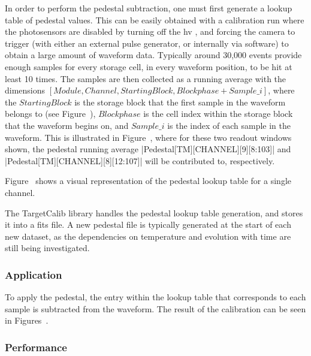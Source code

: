 In order to perform the pedestal subtraction, one must first generate a lookup table of pedestal values. This can be easily obtained with a calibration run where the photosensors are disabled by turning off the \gls{hv} , and forcing the camera to trigger (with either an external pulse generator, or internally via software) to obtain a large amount of waveform data. Typically around 30,000 events provide enough samples for every storage cell, in every waveform position, to be hit at least 10 times. The samples are then collected as a running average with the dimensions $[Module, Channel, Starting Block, Blockphase+Sample\_i]$, where the $Starting Block$ is the storage block that the first sample in the waveform belongs to (see Figure~), $Blockphase$ is the cell index within the storage block that the waveform begins on, and $Sample\_i$ is the index of each sample in the waveform. This is illustrated in Figure~, where for these two readout windows shown, the pedestal running average |Pedestal[TM][CHANNEL][9][8:103]| and |Pedestal[TM][CHANNEL][8][12:107]| will be contributed to, respectively.

Figure~ shows a visual representation of the pedestal lookup table for a single channel. 

The TargetCalib library handles the pedestal lookup table generation, and stores it into a \gls{fits} file. A new pedestal file is typically generated at the start of each new dataset, as the dependencies on temperature and evolution with time are still being investigated.

\subsubsection{Application}

To apply the pedestal, the entry within the lookup table that corresponds to each sample is subtracted from the waveform. The result of the calibration can be seen in Figures~. 

\subsubsection{Performance}


